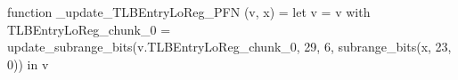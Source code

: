 function _update_TLBEntryLoReg_PFN (v, x) = let v = { v with TLBEntryLoReg_chunk_0 = update_subrange_bits(v.TLBEntryLoReg_chunk_0, 29, 6, subrange_bits(x, 23, 0)) } in
  v
